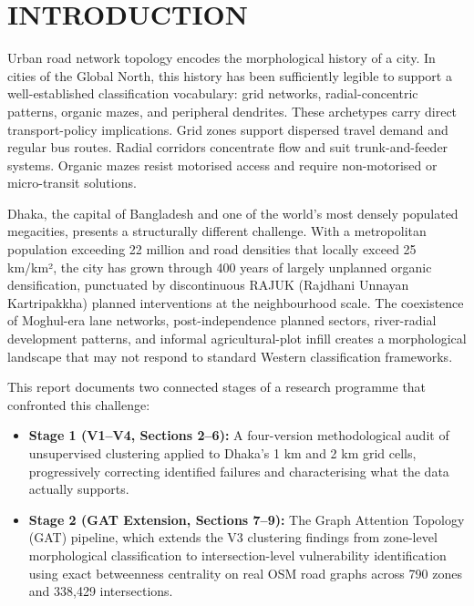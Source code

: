 \documentclass[sigconf, nonacm]{acmart}
\begin{document}

\maketitle

\section{INTRODUCTION}
Urban road network topology encodes the morphological history of a city. In cities of the Global North, this history has been sufficiently legible to support a well-established classification vocabulary: grid networks, radial-concentric patterns, organic mazes, and peripheral dendrites. These archetypes carry direct transport-policy implications. Grid zones support dispersed travel demand and regular bus routes. Radial corridors concentrate flow and suit trunk-and-feeder systems. Organic mazes resist motorised access and require non-motorised or micro-transit solutions.

Dhaka, the capital of Bangladesh and one of the world's most densely populated megacities, presents a structurally different challenge. With a metropolitan population exceeding 22 million and road densities that locally exceed 25 km/km², the city has grown through 400 years of largely unplanned organic densification, punctuated by discontinuous RAJUK (Rajdhani Unnayan Kartripakkha) planned interventions at the neighbourhood scale. The coexistence of Moghul-era lane networks, post-independence planned sectors, river-radial development patterns, and informal agricultural-plot infill creates a morphological landscape that may not respond to standard Western classification frameworks.

This report documents two connected stages of a research programme that confronted this challenge:

\begin{itemize}
    \item \textbf{Stage 1 (V1--V4, Sections 2--6):} A four-version methodological audit of unsupervised clustering applied to Dhaka's 1 km and 2 km grid cells, progressively correcting identified failures and characterising what the data actually supports.
    \item \textbf{Stage 2 (GAT Extension, Sections 7--9):} The Graph Attention Topology (GAT) pipeline, which extends the V3 clustering findings from zone-level morphological classification to intersection-level vulnerability identification using exact betweenness centrality on real OSM road graphs across 790 zones and 338,429 intersections.
\end{itemize}
\end{document}
